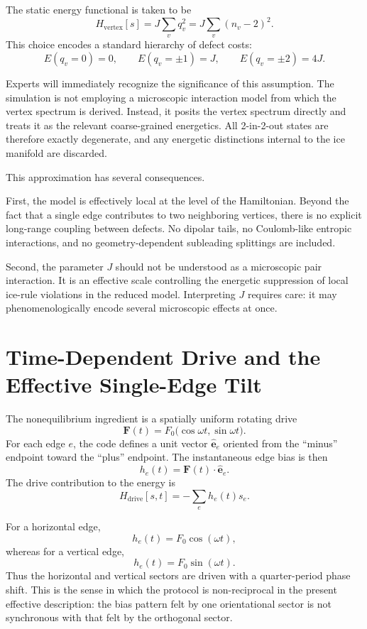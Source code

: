 \documentclass[11pt]{article}
\begin{document}
The static energy functional is taken to be
\[
  H_{\mathrm{vertex}}[s] = J \sum_v q_v^2
  = J\sum_v (n_v-2)^2.
\]
This choice encodes a standard hierarchy of defect costs:
\[
  E(q_v=0)=0,\qquad E(q_v=\pm1)=J,\qquad E(q_v=\pm2)=4J.
\]

Experts will immediately recognize the significance of this assumption. The
simulation is not employing a microscopic interaction model from which the
vertex spectrum is derived. Instead, it posits the vertex spectrum directly and
treats it as the relevant coarse-grained energetics. All 2-in-2-out states are
therefore exactly degenerate, and any energetic distinctions internal to the ice
manifold are discarded.

This approximation has several consequences.

First, the model is effectively local at the level of the Hamiltonian. Beyond
the fact that a single edge contributes to two neighboring vertices, there is no
explicit long-range coupling between defects. No dipolar tails, no Coulomb-like
entropic interactions, and no geometry-dependent subleading splittings are
included.

Second, the parameter $J$ should not be understood as a microscopic pair
interaction. It is an effective scale controlling the energetic suppression of
local ice-rule violations in the reduced model. Interpreting $J$ requires care:
it may phenomenologically encode several microscopic effects at once.

\section{Time-Dependent Drive and the Effective Single-Edge Tilt}

The nonequilibrium ingredient is a spatially uniform rotating drive
\[
  \mathbf{F}(t) = F_0 \bigl(\cos \omega t, \sin \omega t\bigr).
\]
For each edge $e$, the code defines a unit vector $\hat{\mathbf e}_e$ oriented
from the ``minus'' endpoint toward the ``plus'' endpoint. The instantaneous edge
bias is then
\[
  h_e(t) = \mathbf{F}(t)\cdot \hat{\mathbf e}_e.
\]
The drive contribution to the energy is
\[
  H_{\mathrm{drive}}[s,t] = - \sum_e h_e(t)s_e.
\]

For a horizontal edge,
\[
  h_e(t)=F_0\cos(\omega t),
\]
whereas for a vertical edge,
\[
  h_e(t)=F_0\sin(\omega t).
\]
Thus the horizontal and vertical sectors are driven with a quarter-period phase
shift. This is the sense in which the protocol is non-reciprocal in the present
effective description: the bias pattern felt by one orientational sector is not
synchronous with that felt by the orthogonal sector.
\end{document}
